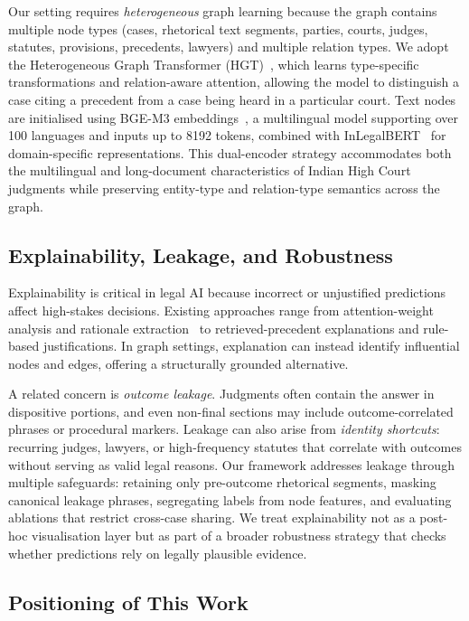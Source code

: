 \documentclass[runningheads]{llncs}
\begin{document}
Our setting requires \emph{heterogeneous} graph learning because the graph contains multiple node types (cases, rhetorical text segments, parties, courts, judges, statutes, provisions, precedents, lawyers) and multiple relation types. We adopt the Heterogeneous Graph Transformer (HGT)~\cite{hu2020heterogeneous}, which learns type-specific transformations and relation-aware attention, allowing the model to distinguish a case citing a precedent from a case being heard in a particular court. Text nodes are initialised using BGE-M3 embeddings~\cite{chen2024bgem3}, a multilingual model supporting over 100 languages and inputs up to 8192 tokens, combined with InLegalBERT~\cite{paul2023inlegalbert} for domain-specific representations. This dual-encoder strategy accommodates both the multilingual and long-document characteristics of Indian High Court judgments while preserving entity-type and relation-type semantics across the graph.

\subsection{Explainability, Leakage, and Robustness}
\label{subsec:explainability-leakage}

Explainability is critical in legal AI because incorrect or unjustified predictions affect high-stakes decisions. Existing approaches range from attention-weight analysis and rationale extraction~\cite{chalkidis2021paragraph,malik2021ildc} to retrieved-precedent explanations and rule-based justifications. In graph settings, explanation can instead identify influential nodes and edges, offering a structurally grounded alternative.

A related concern is \emph{outcome leakage}. Judgments often contain the answer in dispositive portions, and even non-final sections may include outcome-correlated phrases or procedural markers. Leakage can also arise from \emph{identity shortcuts}: recurring judges, lawyers, or high-frequency statutes that correlate with outcomes without serving as valid legal reasons. Our framework addresses leakage through multiple safeguards: retaining only pre-outcome rhetorical segments, masking canonical leakage phrases, segregating labels from node features, and evaluating ablations that restrict cross-case sharing. We treat explainability not as a post-hoc visualisation layer but as part of a broader robustness strategy that checks whether predictions rely on legally plausible evidence.

\subsection{Positioning of This Work}
\label{subsec:positioning}
\end{document}
